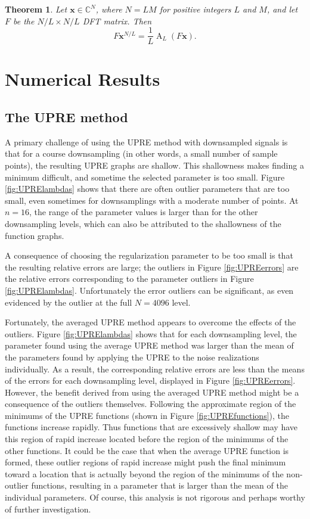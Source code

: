 \documentclass[12pt]{book}
\DeclareMathOperator{\alias}{A}	%
\newtheorem{theorem}{Theorem}[section]
\begin{document}
\begin{theorem}
\label{thm:Downsampling thm}
Let $\mathbf{x} \in \mathbb{C}^N$, where $N = LM$ for positive integers $L$ and $M$, and let $F$ be the $N/L \times N/L$ DFT matrix. Then
\[F\mathbf{x}^{N/L} = \frac{1}{L}\alias_L(F\mathbf{x}).\]
\end{theorem}


\chapter{Numerical Results} \label{Numerical results}

\section{The UPRE method} \label{The UPRE method}
A primary challenge of using the UPRE method with downsampled signals is that for a course downsampling (in other words, a small number of sample points), the resulting UPRE graphs are shallow. This shallowness makes finding a minimum difficult, and sometime the selected parameter is too small. Figure \ref{fig:UPRElambdas} shows that there are often outlier parameters that are too small, even sometimes for downsamplings with a moderate number of points. At $n = 16$, the range of the parameter values is larger than for the other downsampling levels, which can also be attributed to the shallowness of the function graphs. \par 
A consequence of choosing the regularization parameter to be too small is that the resulting relative errors are large; the outliers in Figure \ref{fig:UPREerrors} are the relative errors corresponding to the parameter outliers in Figure \ref{fig:UPRElambdas}. Unfortunately the error outliers can be significant, as even evidenced by the outlier at the full $N = 4096$ level. \par 
Fortunately, the averaged UPRE method appears to overcome the effects of the outliers. Figure \ref{fig:UPRElambdas} shows that for each downsampling level, the parameter found using the average UPRE method was larger than the mean of the parameters found by applying the UPRE to the noise realizations individually. As a result, the corresponding relative errors are less than the means of the errors for each downsampling level, displayed in Figure \ref{fig:UPREerrors}. However, the benefit derived from using the averaged UPRE method might be a consequence of the outliers themselves. Following the approximate region of the minimums of the UPRE functions (shown in Figure \ref{fig:UPREfunctions}), the functions increase rapidly. Thus functions that are excessively shallow may have this region of rapid increase located before the region of the minimums of the other functions. It could be the case that when the average UPRE function is formed, these outlier regions of rapid increase might push the final minimum toward a location that is actually beyond the region of the minimums of the non-outlier functions, resulting in a parameter that is larger than the mean of the individual parameters. Of course, this analysis is not rigorous and perhaps worthy of further investigation. 
\end{document}
